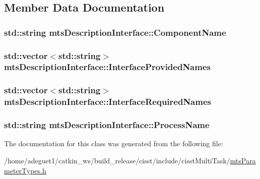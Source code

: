 \subsection{Member Data Documentation}
\hypertarget{classmts_description_interface_a23c0642e38c2a435309fd961f3065a67}{
\subsubsection[{Component\-Name}]{\setlength{\rightskip}{0pt plus 5cm}std\-::string mts\-Description\-Interface\-::\-Component\-Name}}\label{classmts_description_interface_a23c0642e38c2a435309fd961f3065a67}
\hypertarget{classmts_description_interface_ae8e633d272098d0ea2e39406ee453aa3}{
\subsubsection[{Interface\-Provided\-Names}]{\setlength{\rightskip}{0pt plus 5cm}std\-::vector$<$std\-::string$>$ mts\-Description\-Interface\-::\-Interface\-Provided\-Names}}\label{classmts_description_interface_ae8e633d272098d0ea2e39406ee453aa3}
\hypertarget{classmts_description_interface_a7cd4857cf92423bd5f0e481bf394812c}{
\subsubsection[{Interface\-Required\-Names}]{\setlength{\rightskip}{0pt plus 5cm}std\-::vector$<$std\-::string$>$ mts\-Description\-Interface\-::\-Interface\-Required\-Names}}\label{classmts_description_interface_a7cd4857cf92423bd5f0e481bf394812c}
\hypertarget{classmts_description_interface_aa1c020a221d03f7d42beaa0f76133246}{
\subsubsection[{Process\-Name}]{\setlength{\rightskip}{0pt plus 5cm}std\-::string mts\-Description\-Interface\-::\-Process\-Name}}\label{classmts_description_interface_aa1c020a221d03f7d42beaa0f76133246}


The documentation for this class was generated from the following file\-:\begin{DoxyCompactItemize}
\item 
/home/adeguet1/catkin\-\_\-ws/build\-\_\-release/cisst/include/cisst\-Multi\-Task/\hyperlink{mts_parameter_types_8h}{mts\-Parameter\-Types.\-h}\end{DoxyCompactItemize}
